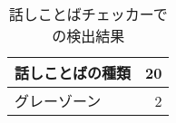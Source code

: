 \begin{table}[H]
\centering
\caption{話しことばチェッカーでの検出結果}
\label{result-checker-detect}
\begin{tabular}{|l|r|}
\hline
話しことばの種類 & 20 \\ \hline
グレーゾーン & 2 \\ \hline
\end{tabular}
\end{table}